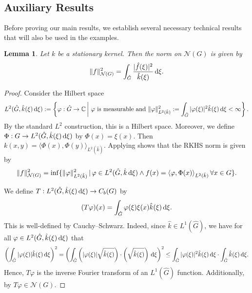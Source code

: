 \documentclass{article}
\renewcommand{\d}{\, \textup{d}}
\newtheorem{lemma}[theorem]{Lemma}
\newcommand{\C}{\mathbb{C}}
\begin{document}
\begin{appendices}
\section{Auxiliary Results}\label{sec:appendix}\label{sec:6}


Before proving our main results, we establish several necessary technical results that will also be used in the examples.

\begin{lemma}\label{lem:Scalarproduct} 
    Let $k$ be a stationary kernel. Then the norm on $\mathcal{N}(G)$ is given by 
    \begin{align*}
        \Vert f \Vert_{\mathcal{N}(G)}^2 = \int_{\hat{G}} \frac{\vert \hat{f}(\xi)\vert^2}{\hat{k}(\xi)} \d \xi.
    \end{align*}
\end{lemma}
\begin{proof}
Consider the Hilbert space
\begin{align*}
    L^2(\hat{G},\hat{k}(\xi) \d \xi) :=\left\{ \varphi:\hat{G} \to \C \, \middle\vert \, \, \varphi \textup{ is measurable and } \Vert \varphi\Vert_{L^2(\hat k)}^2:= \int_{\hat{G}} {\vert \varphi (\xi) \vert^2}{\hat{k}(\xi)} \d \xi < \infty \right\}.
\end{align*} 
By the standard $L^2$ construction, this is a Hilbert space. Moreover, we define $\Phi:G \to L^2(\hat{G},\hat{k}(\xi) \d \xi) $ by  $\Phi(x) = \xi(x)$.
Then $k(x,y)= \langle \Phi(x),\Phi(y)\rangle_{L^2(\hat k )}$. 
Applying \cite[Theorem 4.21]{SteinwartSVM} shows that the RKHS norm is given by 
\begin{align*}
    \Vert f \Vert_{\mathcal{N}(G)}^2 = \inf \{ \Vert \varphi \Vert_{L^2(\hat{k})}^2 \, \vert \, {\varphi \in L^2(\hat{G}, \hat k \d \xi ) } \wedge f(x)=\langle \varphi, \Phi(x) \rangle_{L^2(\hat{k})} \, \forall x \in G\}. 
\end{align*}

    We define $T:L^2(\hat{G},\hat{k}(\xi) \d \xi) \to C_b(G)$ by 
    \begin{align*}
       ( T \varphi) (x)=\int_{\hat{G}} \varphi(\xi) \xi(x) \hat{k}(\xi) \d \xi.
    \end{align*}
    This is well-defined by Cauchy--Schwarz. Indeed, since $\hat{k} \in L^1(\hat{G})$, we have for all $\varphi \in L^2(\hat{G},\hat{k}(\xi) \d \xi)$ that
    \begin{align*}
    \left(        \int_{\hat{G}} \vert \varphi (\xi) \vert \hat{k}(\xi) \d \xi \right)^2 
= \left(        \int_{\hat{G}} \left( \vert \varphi (\xi) \vert  \sqrt{\hat{k}(\xi)}\right) \cdot \left( \sqrt{\hat{k}(\xi)}\right)\d \xi \right)^2 
\leq \int_{\hat{G}} \vert \varphi (\xi) \vert^2 \hat{k}(\xi) \d \xi \cdot \int_{\hat{G}} \hat{k}(\xi) \d \xi.
    \end{align*}
Hence, $T\varphi$ is the inverse Fourier transform of an $L^1(\hat{G})$ function. Additionally, by \cite[Theorem 4.21]{SteinwartSVM} $T\varphi \in \mathcal{N}(G)$.


\end{proof}
\end{appendices}
\end{document}
